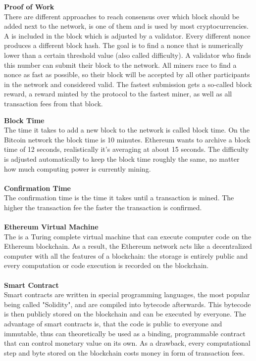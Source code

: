 \textbf{Proof of Work}\\
There are different approaches to reach consensus over which block should be added next to the network,  is one of them and is used by most cryptocurrencies.
A  is included in the block which is adjusted by a validator.
Every different nonce produces a different block hash.
The goal is to find a nonce that is numerically lower than a certain threshold value (also called difficulty).
A validator who finds this number can submit their block to the network.
All miners race to find a nonce as fast as possible, so their block will be accepted by all other participants in the network and considered valid.
The fastest submission gets a so-called block reward, a reward minted by the protocol to the fastest miner, as well as all transaction fees from that block.
\newpage

\textbf{Block Time}\\
The time it takes to add a new block to the network is called block time.
On the Bitcoin network the block time is 10 minutes\cite{bitcoin-whitepaper}.
Ethereum wants to archive a block time of 12 seconds\cite{ethereum-blocktime}, realistically it's averaging at about 15 seconds\cite{ethereum-blocktime-chart}.
The difficulty is adjusted automatically to keep the block time roughly the same, no matter how much computing power is currently mining.
\\\\

\textbf{Confirmation Time}\\
The confirmation time is the time it takes until a transaction is mined.
The higher the transaction fee the faster the transaction is confirmed.
\\\\

\textbf{Ethereum Virtual Machine}\\
The  is a Turing complete virtual machine that can execute computer code on the Ethereum blockchain.
As a result, the Ethereum network acts like a decentralized computer with all the features of a blockchain: the storage is entirely public and every computation or code execution is recorded on the blockchain.
\\\\

\textbf{Smart Contract}\\
Smart contracts are written in special programming languages, the most popular being called "Solidity", and are compiled into bytecode afterwards.
This bytecode is then publicly stored on the blockchain and can be executed by everyone.
The advantage of smart contracts is, that the code is public to everyone and immutable, thus can theoretically be used as a binding, programmable contract that can control monetary value on its own.
As a drawback, every computational step and byte stored on the blockchain costs money in form of transaction fees.
\\\\

